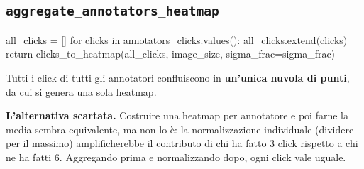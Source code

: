 \subsection{\texttt{aggregate\_annotators\_heatmap}}

\begin{idebox}
\begin{pycode}
all_clicks = []
for clicks in annotators_clicks.values():
    all_clicks.extend(clicks)
return clicks_to_heatmap(all_clicks, image_size, sigma_frac=sigma_frac)
\end{pycode}
\end{idebox}

Tutti i click di tutti gli annotatori confluiscono in \textbf{un'unica nuvola di punti}, da cui
si genera una sola heatmap.

\begin{nota}
\textbf{L'alternativa scartata.} Costruire una heatmap per annotatore e poi farne la media sembra
equivalente, ma non lo è: la normalizzazione individuale (dividere per il massimo) amplificherebbe
il contributo di chi ha fatto 3 click rispetto a chi ne ha fatti 6. Aggregando prima e
normalizzando dopo, ogni click vale uguale.
\end{nota}
